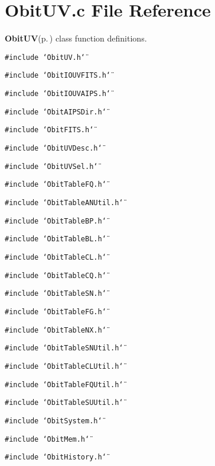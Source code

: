 \section{Obit\-UV.c File Reference}
\label{ObitUV_8c}
{\bf Obit\-UV}{\rm (p.\,\pageref{structObitUV})} class function definitions. 

{\tt \#include \char`\"{}Obit\-UV.h\char`\"{}}\par
{\tt \#include \char`\"{}Obit\-IOUVFITS.h\char`\"{}}\par
{\tt \#include \char`\"{}Obit\-IOUVAIPS.h\char`\"{}}\par
{\tt \#include \char`\"{}Obit\-AIPSDir.h\char`\"{}}\par
{\tt \#include \char`\"{}Obit\-FITS.h\char`\"{}}\par
{\tt \#include \char`\"{}Obit\-UVDesc.h\char`\"{}}\par
{\tt \#include \char`\"{}Obit\-UVSel.h\char`\"{}}\par
{\tt \#include \char`\"{}Obit\-Table\-FQ.h\char`\"{}}\par
{\tt \#include \char`\"{}Obit\-Table\-ANUtil.h\char`\"{}}\par
{\tt \#include \char`\"{}Obit\-Table\-BP.h\char`\"{}}\par
{\tt \#include \char`\"{}Obit\-Table\-BL.h\char`\"{}}\par
{\tt \#include \char`\"{}Obit\-Table\-CL.h\char`\"{}}\par
{\tt \#include \char`\"{}Obit\-Table\-CQ.h\char`\"{}}\par
{\tt \#include \char`\"{}Obit\-Table\-SN.h\char`\"{}}\par
{\tt \#include \char`\"{}Obit\-Table\-FG.h\char`\"{}}\par
{\tt \#include \char`\"{}Obit\-Table\-NX.h\char`\"{}}\par
{\tt \#include \char`\"{}Obit\-Table\-SNUtil.h\char`\"{}}\par
{\tt \#include \char`\"{}Obit\-Table\-CLUtil.h\char`\"{}}\par
{\tt \#include \char`\"{}Obit\-Table\-FQUtil.h\char`\"{}}\par
{\tt \#include \char`\"{}Obit\-Table\-SUUtil.h\char`\"{}}\par
{\tt \#include \char`\"{}Obit\-System.h\char`\"{}}\par
{\tt \#include \char`\"{}Obit\-Mem.h\char`\"{}}\par
{\tt \#include \char`\"{}Obit\-History.h\char`\"{}}\par
